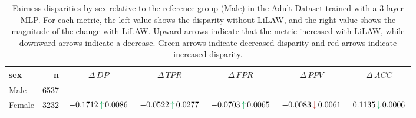 \documentclass{article}
\theoremstyle{plain}
\theoremstyle{definition}
\theoremstyle{remark}
\begin{document}
\begin{table}[h!]
\centering
\scriptsize
\setlength{\tabcolsep}{3pt}
\renewcommand{\arraystretch}{1.15}
{%
\begin{tabular}{lrccccc}
\toprule
sex & n & $\Delta\,DP$ & $\Delta\,TPR$ & $\Delta\,FPR$ & $\Delta\,PPV$ & $\Delta\,ACC$ \\
\midrule
Male   & 6537 & $-$ & $-$ & $-$ & $-$ & $-$ \\
Female & 3232 & $\,-0.1712\,\Up\,0.0086\,$ & $\,-0.0522\,\Up\,0.0277\,$ & $\,-0.0703\,\Up\,0.0065\,$ & $\,-0.0083\,\Down\,0.0061\,$ & $\,0.1135\,\Downg\,0.0006\,$ \\
\bottomrule
\end{tabular}%
}
\caption{Fairness disparities by sex relative to the reference group (Male) in the Adult Dataset trained with a 3-layer MLP. For each metric, the left value shows the disparity without LiLAW, and the right value shows the magnitude of the change with LiLAW. Upward arrows indicate that the metric increased with LiLAW, while downward arrows indicate a decrease. Green arrows indicate decreased disparity and red arrows indicate increased disparity.}
\label{tab:sex}
\end{table}
\end{document}
